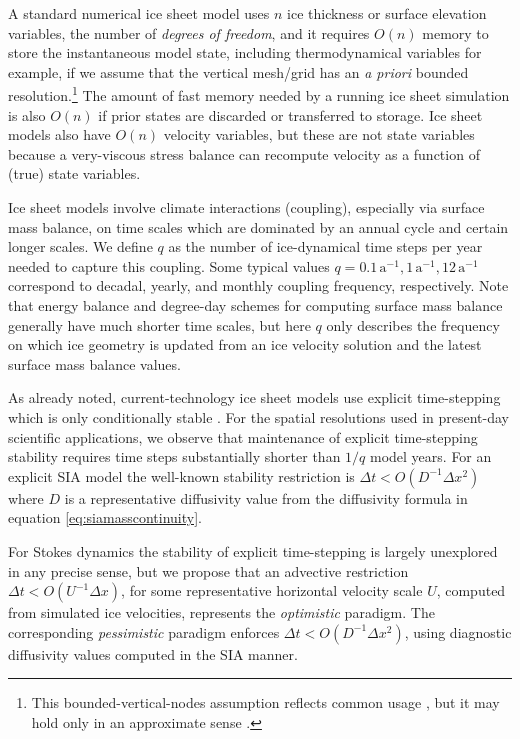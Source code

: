 \documentclass[twocolumn,letterpaper]{igs}
\begin{document}
A standard numerical ice sheet model uses $n$ ice thickness or surface elevation variables, the number of \emph{degrees of freedom}, and it requires $O(n)$ memory to store the instantaneous model state, including thermodynamical variables for example, if we assume that the vertical mesh/grid has an \emph{a priori} bounded resolution.\footnote{This bounded-vertical-nodes assumption reflects common usage \citep[for example]{Aschwandenetal2019,Brinkerhoffetal2017,Hoffmanetal2018}, but it may hold only in an approximate sense \citep{IsaacStadlerGhattas2015}.}  The amount of fast memory needed by a running ice sheet simulation is also $O(n)$ if prior states are discarded or transferred to storage.  Ice sheet models also have $O(n)$ velocity variables, but these are not state variables because a very-viscous stress balance can recompute velocity as a function of (true) state variables.
 
Ice sheet models involve climate interactions (coupling), especially via surface mass balance, on time scales which are dominated by an annual cycle and certain longer scales.  We define $q$ as the number of ice-dynamical time steps per year needed to capture this coupling.  Some typical values $q=0.1 \,\text{a}^{-1}, 1 \,\text{a}^{-1}, 12 \,\text{a}^{-1}$ correspond to decadal, yearly, and monthly coupling frequency, respectively.  Note that energy balance and degree-day schemes for computing surface mass balance generally have much shorter time scales, but here $q$ only describes the frequency on which ice geometry is updated from an ice velocity solution and the latest surface mass balance values.

As already noted, current-technology ice sheet models use explicit time-stepping which is only conditionally stable \citep{LeVeque2007}.  For the spatial resolutions used in present-day scientific applications, we observe that maintenance of explicit time-stepping stability requires time steps substantially shorter than $1/q$ model years.  For an explicit SIA model the well-known stability restriction is $\Delta t < O(D^{-1} \Delta x^2)$ \citep{Bueleretal2005,HindmarshPayne1996} where $D$ is a representative diffusivity value from the diffusivity formula in equation \eqref{eq:siamasscontinuity}.

For Stokes dynamics the stability of explicit time-stepping is largely unexplored in any precise sense, but we propose that an advective restriction $\Delta t < O(U^{-1} \Delta x)$, for some representative horizontal velocity scale $U$, computed from simulated ice velocities, represents the \emph{optimistic} paradigm.  The corresponding \emph{pessimistic} paradigm enforces $\Delta t < O(D^{-1} \Delta x^2)$, using diagnostic diffusivity values computed in the SIA manner.
\end{document}
